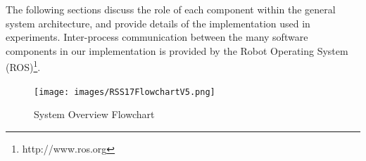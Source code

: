 \documentclass[journal]{IEEEtran}
\newcommand{\separator}{ \noindent \rule{\columnwidth}{1pt} }
\newenvironment{old}{\color{Maroon} \separator \textbf{[\textit{Old:}]} }{\ignorespacesafterend \separator}
\begin{document}
The following sections discuss the role of each component within the general system architecture, and provide details of the implementation used in experiments. Inter-process communication between the many software components in our implementation is provided by the Robot Operating System (ROS)\footnote{http://www.ros.org}.  
%


%
\begin{figure}
\begin{center}
\texttt{[image: images/RSS17FlowchartV5.png]}
\caption{System Overview Flowchart}
\label{fig:overview}
\end{center}
\vspace{-1em}
\end{figure}
\end{document}
